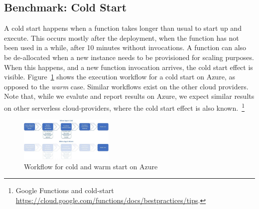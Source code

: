 
\subsection{Benchmark: Cold Start}
\label{sec:coldstart}
A cold start happens when a function takes longer than usual to start up and execute. 
This occurs mostly after the deployment, when the function has not been used in a while, \eg after 10 minutes without invocations.
A function can also be de-allocated when a new instance needs to be provisioned for scaling purposes. 
When this happens, and a new function invocation arrives, the cold start effect is visible.
Figure~\ref{fig:azure_coldstart} shows the execution workflow for a cold start on Azure, as opposed to the \emph{warm} case. Similar workflows exist on the other cloud providers.
Note that, while we evalute and report results on Azure, we expect similar results on other serverless cloud-providers, where the cold start effect is also known.~\footnote{Google Functions and cold-start \url{https://cloud.google.com/functions/docs/bestpractices/tips}.}

\begin{figure}[!t]
\centering
\includegraphics[width=0.4\textwidth]{bilder/azure-coldstart.jpeg}
\caption{Workflow for cold and warm start on Azure~\cite{AzureColdStart}}
\label{fig:azure_coldstart}
\end{figure}

